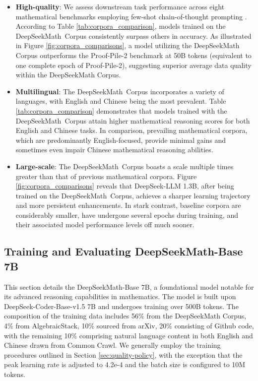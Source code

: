 \begin{itemize}[topsep=0pt]
\begin{itemize}[topsep=0pt]
    \item \textbf{High-quality}:
    We assess downstream task performance across eight mathematical benchmarks employing few-shot chain-of-thought prompting \cite{cot}. According to Table \ref{tab:corpora_comparison}, models trained on the DeepSeekMath~Corpus consistently surpass others in accuracy. As illustrated in Figure \ref{fig:corpora_comparisons}, a model utilizing the DeepSeekMath Corpus outperforms the Proof-Pile-2 benchmark at 50B tokens (equivalent to one complete epoch of Proof-Pile-2), suggesting superior average data quality within the DeepSeekMath Corpus. 
    \item \textbf{Multilingual}:
    The DeepSeekMath~Corpus incorporates a variety of languages, with English and Chinese being the most prevalent. Table \ref{tab:corpora_comparison} demonstrates that models trained with the DeepSeekMath~Corpus attain higher mathematical reasoning scores for both English and Chinese tasks. In comparison, prevailing mathematical corpora, which are predominantly English-focused, provide minimal gains and sometimes even impair Chinese mathematical reasoning abilities.
    \item \textbf{Large-scale}:
    The DeepSeekMath~Corpus boasts a scale multiple times greater than that of previous mathematical corpora. Figure \ref{fig:corpora_comparisons} reveals that DeepSeek-LLM 1.3B, after being trained on the DeepSeekMath~Corpus, achieves a sharper learning trajectory and more persistent enhancements. In stark contrast, baseline corpora are considerably smaller, have undergone several epochs during training, and their associated model performance levels off much sooner.
\end{itemize}

\subsection{Training and Evaluating DeepSeekMath-Base 7B}

This section details the DeepSeekMath-Base 7B, a foundational model notable for its advanced reasoning capabilities in mathematics. The model is built upon DeepSeek-Coder-Base-v1.5 7B \citep{deepseek-coder} and undergoes training over 500B tokens. The composition of the training data includes 56\% from the DeepSeekMath Corpus, 4\% from AlgebraicStack, 10\% sourced from arXiv, 20\% consisting of Github code, with the remaining 10\% comprising natural language content in both English and Chinese drawn from Common Crawl. We generally employ the training procedures outlined in Section \ref{sec:quality-policy}, with the exception that the peak learning rate is adjusted to 4.2e-4 and the batch size is configured to 10M tokens.


\end{itemize}
